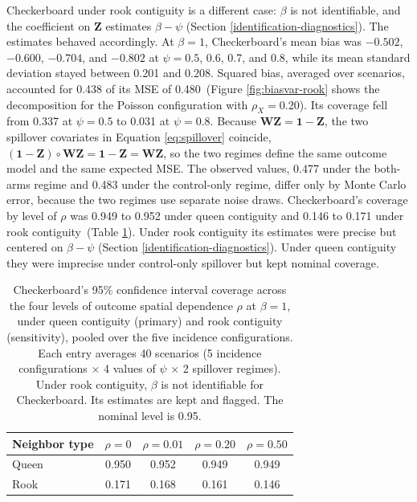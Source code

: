 \documentclass[11pt]{article}
\begin{document}
Checkerboard under rook contiguity is a different case: \(\beta\) is not
identifiable, and the coefficient on \(\mathbf{Z}\) estimates \(\beta - \psi\)
(Section \ref{identification-diagnostics}). The estimates behaved accordingly. At \(\beta = 1\),
Checkerboard's mean bias was \(-0.502\), \(-0.600\), \(-0.704\), and
\(-0.802\) at \(\psi = 0.5\), 0.6, 0.7, and 0.8, while its mean
standard deviation stayed between 0.201 and 0.208. Squared bias, averaged
over scenarios, accounted for 0.438 of its MSE of 0.480\iffullsi\ (Figure
\ref{fig:biasvar-rook} shows the
decomposition for the Poisson configuration with \(\rho_X = 0.20\))\fi. Its
coverage fell from 0.337 at \(\psi = 0.5\) to 0.031 at
\(\psi = 0.8\). Because \(\mathbf{W}\mathbf{Z} = \mathbf{1} - \mathbf{Z}\), the two spillover covariates
in Equation \ref{eq:spillover} coincide,
\((\mathbf{1} - \mathbf{Z}) \circ \mathbf{W}\mathbf{Z} = \mathbf{1} - \mathbf{Z} = \mathbf{W}\mathbf{Z}\), so the two
regimes define the same outcome model and the same expected MSE. The
observed values, 0.477 under the both-arms regime and 0.483 under the
control-only regime, differ only by Monte Carlo error, because the two
regimes use separate noise draws. Checkerboard's coverage by level of
\(\rho\) was 0.949 to 0.952 under queen contiguity and 0.146 to 0.171
under rook contiguity\iffullsi\ (Table \ref{tab:checkerboard-coverage})\fi.
Under rook contiguity its estimates were precise but centered on \(\beta-\psi\) (Section \ref{identification-diagnostics}).
Under queen contiguity they were imprecise under control-only spillover
but kept nominal coverage.

\iffullsi
\begin{table}[!htb]

\small
\centering

\caption{Checkerboard's 95\% confidence interval coverage across the four levels of outcome spatial dependence $\rho$ at $\beta = 1$, under queen contiguity (primary) and rook contiguity (sensitivity), pooled over the five incidence configurations. Each entry averages 40 scenarios (5 incidence configurations $\times$ 4 values of $\psi$ $\times$ 2 spillover regimes). Under rook contiguity, $\beta$ is not identifiable for Checkerboard. Its estimates are kept and flagged. The nominal level is 0.95.}
\label{tab:checkerboard-coverage}

\begin{tabular}{lcccc}

\toprule
Neighbor type & $\rho=0$ & $\rho=0.01$ & $\rho=0.20$ & $\rho=0.50$ \\

\midrule
Queen & 0.950 & 0.952 & 0.949 & 0.949 \\
Rook & 0.171 & 0.168 & 0.161 & 0.146 \\

\bottomrule

\end{tabular}

\end{table}
\fi
\end{document}

